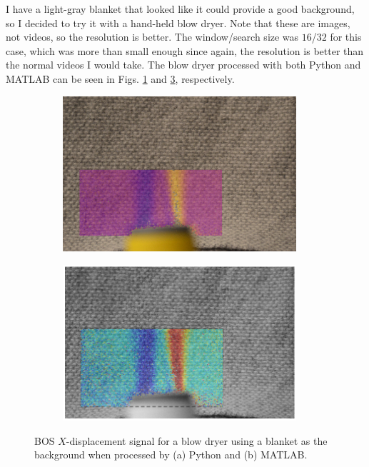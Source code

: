\documentclass[letterpaper,12pt]{article}
\begin{document}
I have a light-gray blanket that looked like it could provide a good background, so I decided to try it with a hand-held blow dryer.  Note that these are images, not videos, so the resolution is better.  The window/search size was $16$/$32$ for this case, which was more than small enough since again, the resolution is better than the normal videos I would take.  The blow dryer processed with both Python and MATLAB can be seen in Figs. \ref{fig:Python_Blow_Dryer} and \ref{fig:MATLAB_Blow_Dryer}, respectively.

\begin{figure}[h]
    \centering
    \begin{subfigure}[b]{0.45\textwidth}
    	\centering
        \includegraphics[width=0.95\textwidth]{Python_Hairdryer.PNG}
        \caption{}
        \label{fig:Python_Blow_Dryer}
    \end{subfigure}
    \begin{subfigure}[b]{0.45\textwidth}
    	\centering
        \includegraphics[width=0.95\textwidth]{MATLAB_Hairdryer.PNG}
        \caption{}
        \label{fig:MATLAB_Blow_Dryer}
    \end{subfigure}

    \caption{BOS $X$-displacement signal for a blow dryer using a blanket as the background when processed by (a) Python and (b) MATLAB.}
\end{figure}
\end{document}
